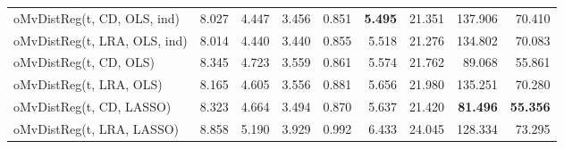 \begin{tabular}{lrrrrrrrr}
oMvDistReg(t, CD, OLS, ind) & {\cellcolor[HTML]{79FE59}} \color[HTML]{000000} 8.027 & {\cellcolor[HTML]{4143A7}} \color[HTML]{F1F1F1} 4.447 & {\cellcolor[HTML]{2CB7F0}} \color[HTML]{F1F1F1} 3.456 & {\cellcolor[HTML]{30123B}} \color[HTML]{F1F1F1} 0.851 & {\cellcolor[HTML]{30123B}} \color[HTML]{F1F1F1} \bfseries 5.495 & {\cellcolor[HTML]{1AD2D2}} \color[HTML]{000000} 21.351 & {\cellcolor[HTML]{7A0403}} \color[HTML]{F1F1F1} 137.906 & {\cellcolor[HTML]{D4E735}} \color[HTML]{000000} 70.410 \\
oMvDistReg(t, LRA, OLS, ind) & {\cellcolor[HTML]{71FE5F}} \color[HTML]{000000} 8.014 & {\cellcolor[HTML]{3F3E9C}} \color[HTML]{F1F1F1} 4.440 & {\cellcolor[HTML]{38A5FB}} \color[HTML]{F1F1F1} 3.440 & {\cellcolor[HTML]{38276D}} \color[HTML]{F1F1F1} 0.855 & {\cellcolor[HTML]{36215F}} \color[HTML]{F1F1F1} 5.518 & {\cellcolor[HTML]{20C7DF}} \color[HTML]{000000} 21.276 & {\cellcolor[HTML]{A71401}} \color[HTML]{F1F1F1} 134.802 & {\cellcolor[HTML]{CDEC34}} \color[HTML]{000000} 70.083 \\
oMvDistReg(t, CD, OLS) & {\cellcolor[HTML]{F9BC39}} \color[HTML]{000000} 8.345 & {\cellcolor[HTML]{55FA76}} \color[HTML]{000000} 4.723 & {\cellcolor[HTML]{4EF97D}} \color[HTML]{000000} 3.559 & {\cellcolor[HTML]{3F3E9C}} \color[HTML]{F1F1F1} 0.861 & {\cellcolor[HTML]{4249B1}} \color[HTML]{F1F1F1} 5.574 & {\cellcolor[HTML]{46F884}} \color[HTML]{000000} 21.762 & {\cellcolor[HTML]{4771E9}} \color[HTML]{F1F1F1} 89.068 & {\cellcolor[HTML]{351E58}} \color[HTML]{F1F1F1} 55.861 \\
oMvDistReg(t, LRA, OLS) & {\cellcolor[HTML]{BEF434}} \color[HTML]{000000} 8.165 & {\cellcolor[HTML]{22C5E2}} \color[HTML]{000000} 4.605 & {\cellcolor[HTML]{46F884}} \color[HTML]{000000} 3.556 & {\cellcolor[HTML]{4391FE}} \color[HTML]{F1F1F1} 0.881 & {\cellcolor[HTML]{467DF4}} \color[HTML]{F1F1F1} 5.656 & {\cellcolor[HTML]{80FF53}} \color[HTML]{000000} 21.980 & {\cellcolor[HTML]{A11201}} \color[HTML]{F1F1F1} 135.251 & {\cellcolor[HTML]{D2E935}} \color[HTML]{000000} 70.280 \\
oMvDistReg(t, CD, LASSO) & {\cellcolor[HTML]{F5C53A}} \color[HTML]{000000} 8.323 & {\cellcolor[HTML]{1DE7B2}} \color[HTML]{000000} 4.664 & {\cellcolor[HTML]{18D7CA}} \color[HTML]{000000} 3.494 & {\cellcolor[HTML]{4664DA}} \color[HTML]{F1F1F1} 0.870 & {\cellcolor[HTML]{4771E9}} \color[HTML]{F1F1F1} 5.637 & {\cellcolor[HTML]{18DBC5}} \color[HTML]{000000} 21.420 & {\cellcolor[HTML]{30123B}} \color[HTML]{F1F1F1} \bfseries 81.496 & {\cellcolor[HTML]{30123B}} \color[HTML]{F1F1F1} \bfseries 55.356 \\
oMvDistReg(t, LRA, LASSO) & {\cellcolor[HTML]{7A0403}} \color[HTML]{F1F1F1} 8.858 & {\cellcolor[HTML]{7A0403}} \color[HTML]{F1F1F1} 5.190 & {\cellcolor[HTML]{7A0403}} \color[HTML]{F1F1F1} 3.929 & {\cellcolor[HTML]{DD3D08}} \color[HTML]{F1F1F1} 0.992 & {\cellcolor[HTML]{C82803}} \color[HTML]{F1F1F1} 6.433 & {\cellcolor[HTML]{7A0403}} \color[HTML]{F1F1F1} 24.045 & {\cellcolor[HTML]{E5470B}} \color[HTML]{F1F1F1} 128.334 & {\cellcolor[HTML]{FDAE35}} \color[HTML]{000000} 73.295 \\
\bottomrule
\end{tabular}
